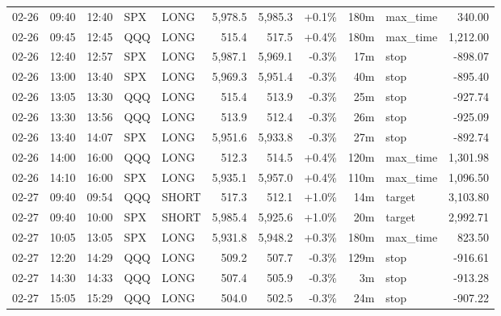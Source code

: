 \documentclass[11pt,a4paper,twoside]{article}
\begin{document}
\begin{center}
\begin{longtable}{>{\color{txtmain}}l l l l l r r r r >{\color{txtmain}}l r}
02-26 & 09:40 & 12:40 & SPX & LONG & 5,978.5 & 5,985.3 & \textcolor{wingreen}{+0.1\%} & 180m & max\_time & \textcolor{wingreen}{340.00} \\
02-26 & 09:45 & 12:45 & QQQ & LONG & 515.4 & 517.5 & \textcolor{wingreen}{+0.4\%} & 180m & max\_time & \textcolor{wingreen}{1,212.00} \\
02-26 & 12:40 & 12:57 & SPX & LONG & 5,987.1 & 5,969.1 & \textcolor{lossred}{-0.3\%} & 17m & stop & \textcolor{lossred}{-898.07} \\
02-26 & 13:00 & 13:40 & SPX & LONG & 5,969.3 & 5,951.4 & \textcolor{lossred}{-0.3\%} & 40m & stop & \textcolor{lossred}{-895.40} \\
02-26 & 13:05 & 13:30 & QQQ & LONG & 515.4 & 513.9 & \textcolor{lossred}{-0.3\%} & 25m & stop & \textcolor{lossred}{-927.74} \\
02-26 & 13:30 & 13:56 & QQQ & LONG & 513.9 & 512.4 & \textcolor{lossred}{-0.3\%} & 26m & stop & \textcolor{lossred}{-925.09} \\
02-26 & 13:40 & 14:07 & SPX & LONG & 5,951.6 & 5,933.8 & \textcolor{lossred}{-0.3\%} & 27m & stop & \textcolor{lossred}{-892.74} \\
02-26 & 14:00 & 16:00 & QQQ & LONG & 512.3 & 514.5 & \textcolor{wingreen}{+0.4\%} & 120m & max\_time & \textcolor{wingreen}{1,301.98} \\
02-26 & 14:10 & 16:00 & SPX & LONG & 5,935.1 & 5,957.0 & \textcolor{wingreen}{+0.4\%} & 110m & max\_time & \textcolor{wingreen}{1,096.50} \\
02-27 & 09:40 & 09:54 & QQQ & SHORT & 517.3 & 512.1 & \textcolor{wingreen}{+1.0\%} & 14m & target & \textcolor{wingreen}{3,103.80} \\
02-27 & 09:40 & 10:00 & SPX & SHORT & 5,985.4 & 5,925.6 & \textcolor{wingreen}{+1.0\%} & 20m & target & \textcolor{wingreen}{2,992.71} \\
02-27 & 10:05 & 13:05 & SPX & LONG & 5,931.8 & 5,948.2 & \textcolor{wingreen}{+0.3\%} & 180m & max\_time & \textcolor{wingreen}{823.50} \\
02-27 & 12:20 & 14:29 & QQQ & LONG & 509.2 & 507.7 & \textcolor{lossred}{-0.3\%} & 129m & stop & \textcolor{lossred}{-916.61} \\
02-27 & 14:30 & 14:33 & QQQ & LONG & 507.4 & 505.9 & \textcolor{lossred}{-0.3\%} & 3m & stop & \textcolor{lossred}{-913.28} \\
02-27 & 15:05 & 15:29 & QQQ & LONG & 504.0 & 502.5 & \textcolor{lossred}{-0.3\%} & 24m & stop & \textcolor{lossred}{-907.22} \\

\end{longtable}
\end{center}
\end{document}
